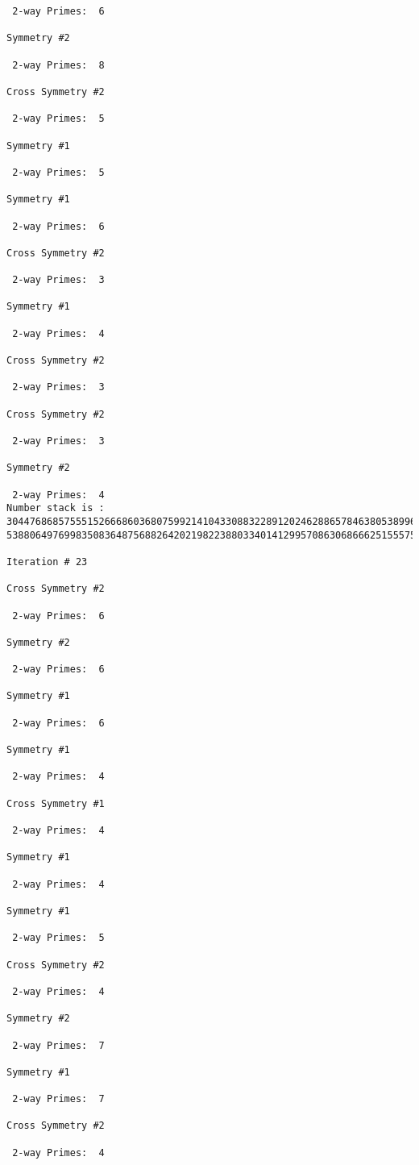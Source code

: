 \begin{verbatim}
 2-way Primes: 	6

Symmetry #2

 2-way Primes: 	8

Cross Symmetry #2

 2-way Primes: 	5

Symmetry #1

 2-way Primes: 	5

Symmetry #1

 2-way Primes: 	6

Cross Symmetry #2

 2-way Primes: 	3

Symmetry #1

 2-way Primes: 	4

Cross Symmetry #2

 2-way Primes: 	3

Cross Symmetry #2

 2-way Primes: 	3

Symmetry #2

 2-way Primes: 	4
Number stack is :
30447686857555152666860368075992141043308832289120246288657846380538996794608835958544046240163340857
53880649769983508364875688264202198223880334014129957086306866625155575868674403758043361042640445859

Iteration #	23

Cross Symmetry #2

 2-way Primes: 	6

Symmetry #2

 2-way Primes: 	6

Symmetry #1

 2-way Primes: 	6

Symmetry #1

 2-way Primes: 	4

Cross Symmetry #1

 2-way Primes: 	4

Symmetry #1

 2-way Primes: 	4

Symmetry #1

 2-way Primes: 	5

Cross Symmetry #2

 2-way Primes: 	4

Symmetry #2

 2-way Primes: 	7

Symmetry #1

 2-way Primes: 	7

Cross Symmetry #2

 2-way Primes: 	4


\end{verbatim}
